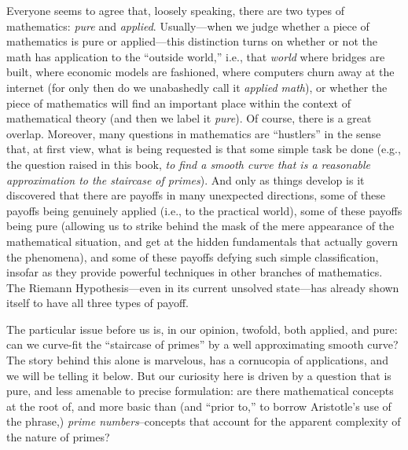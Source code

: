 \documentclass[11pt,draft]{article}
\theoremstyle{plain}
\theoremstyle{definition}
\numberwithin{equation}{section}
\numberwithin{figure}{section}
\numberwithin{table}{section}
\begin{document}
Everyone seems to agree that, loosely speaking, there are two types of
mathematics: {\em pure} and {\em applied}. Usually---when we judge
whether a piece of mathematics is pure or applied---this distinction
turns on whether or not the math has application to the ``outside
world,'' i.e., that {\em world} where bridges are built, where economic
models are fashioned, where computers churn away at the internet (for
only then do we unabashedly call it {\em applied math}), or whether
the piece of mathematics will find an important place within the
context of mathematical theory (and then we label it {\em pure}).  Of
course, there is a great overlap. Moreover, many questions in
mathematics are ``hustlers'' in the sense that, at first view, what is
being requested is that some simple task be done (e.g., the question
raised in this book, {\em to find a smooth curve that is a reasonable
  approximation to the staircase of primes}).  And only as things
develop is it discovered that there are payoffs in many unexpected
directions, some of these payoffs being genuinely applied (i.e., to
the practical world), some of these payoffs being pure (allowing us
to strike behind the mask of the mere appearance of the mathematical
situation, and get at the hidden fundamentals that actually govern the
phenomena), and some of these payoffs defying such simple
classification, insofar as they provide powerful techniques in other
branches of mathematics.  The Riemann Hypothesis---even in its current
unsolved state---has already shown itself to have all three types of
payoff.

The particular issue before us is, in our opinion, twofold, both
applied, and pure: can we curve-fit the ``staircase of primes'' by a
well approximating smooth curve?  The story behind this alone is
marvelous, has a cornucopia of applications, and we will be telling it
below. But our curiosity here is driven by a question that is pure,
and less amenable to precise formulation: are there mathematical
concepts at the root of, and more basic than (and ``prior to,'' to
borrow Aristotle's use of the phrase,) {\em prime numbers}--concepts
that account for the apparent complexity of the nature of primes?
   
   
   
\end{document}
